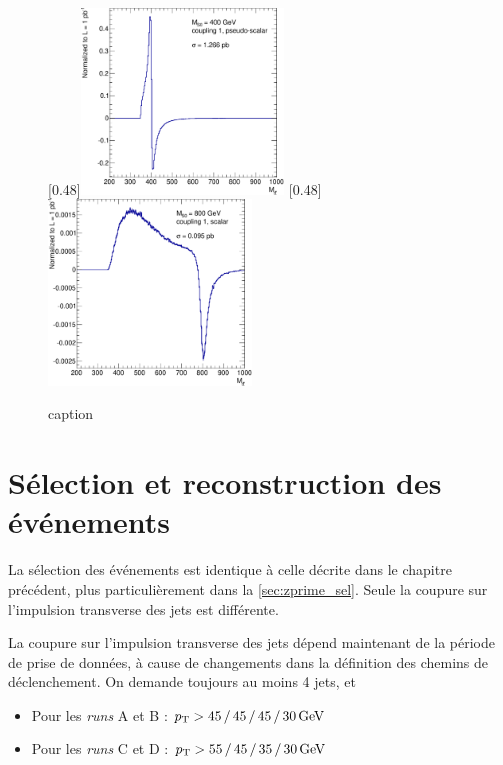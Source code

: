 \begin{figure}[tbp] \centering
    [0.48\textwidth]{\includegraphics[width=0.48\textwidth]{chapitre8/figs/S0/plot_400_cpl1_pseudoscalar_normalized.pdf}} \hfill
    [0.48\textwidth]{\includegraphics[width=0.48\textwidth]{chapitre8/figs/S0/plot_800_cpl1_normalized.pdf}}
    \caption{caption}
    \label{fig:gen_higgs}
\end{figure}

\section{Sélection et reconstruction des événements}

La sélection des événements est identique à celle décrite dans le chapitre précédent, plus particulièrement dans la \cref{sec:zprime_sel}. Seule la coupure sur l'impulsion transverse des jets est différente.

La coupure sur l'impulsion transverse des jets dépend maintenant de la période de prise de données, à cause de changements dans la définition des chemins de déclenchement. On demande toujours au moins 4 jets, et
\begin{itemize}
    \item Pour les \emph{runs} A et B : $\pt > 45\,/\,45\,/\,45\,/\,\SI{30}{\GeV}$
    \item Pour les \emph{runs} C et D : $\pt > 55\,/\,45\,/\,35\,/\,\SI{30}{\GeV}$
\end{itemize}

